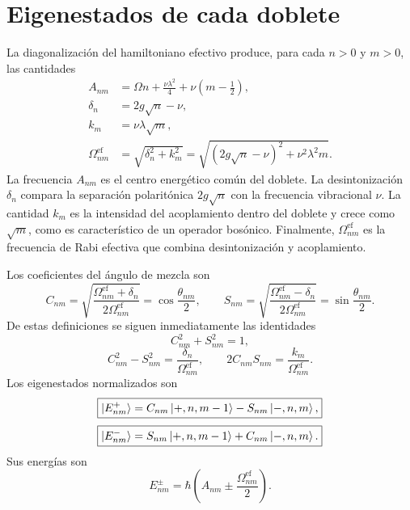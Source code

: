 \documentclass[11pt]{article}
\begin{document}
\section{Eigenestados de cada doblete}

La diagonalizaci\'on del hamiltoniano efectivo produce, para cada $n>0$ y
$m>0$, las cantidades
\begin{equation}
  \boxed{
  \begin{aligned}
  A_{nm}
  &=
  \Omega n+\frac{\nu\lambda^2}{4}
  +
  \nu\left(m-\frac12\right),
  \\
  \delta_n
  &=
  2g\sqrt n-\nu,
  \\
  k_m
  &=
  \nu\lambda\sqrt m,
  \\
  \Omega_{nm}^{\mathrm{ef}}
  &=
  \sqrt{\delta_n^2+k_m^2}
  =
  \sqrt{(2g\sqrt n-\nu)^2+\nu^2\lambda^2m}.
  \end{aligned}
  }
\end{equation}
La frecuencia $A_{nm}$ es el centro energ\'etico com\'un del doblete.
La desintonizaci\'on $\delta_n$ compara la separaci\'on polarit\'onica
$2g\sqrt n$ con la frecuencia vibracional $\nu$. La cantidad $k_m$ es la
intensidad del acoplamiento dentro del doblete y crece como $\sqrt m$, como es
caracter\'istico de un operador bos\'onico. Finalmente,
$\Omega_{nm}^{\mathrm{ef}}$ es la frecuencia de Rabi efectiva que combina
desintonizaci\'on y acoplamiento.

Los coeficientes del \'angulo de mezcla son
\begin{equation}
  \boxed{
  C_{nm}
  =
  \sqrt{
  \frac{\Omega_{nm}^{\mathrm{ef}}+\delta_n}
  {2\Omega_{nm}^{\mathrm{ef}}}
  }
  =
  \cos\frac{\theta_{nm}}{2},
  \qquad
  S_{nm}
  =
  \sqrt{
  \frac{\Omega_{nm}^{\mathrm{ef}}-\delta_n}
  {2\Omega_{nm}^{\mathrm{ef}}}
  }
  =
  \sin\frac{\theta_{nm}}{2}.
  }
\end{equation}
De estas definiciones se siguen inmediatamente las identidades
\begin{equation}
  C_{nm}^2+S_{nm}^2=1,
\end{equation}
\begin{equation}
  \boxed{
  C_{nm}^2-S_{nm}^2
  =
  \frac{\delta_n}{\Omega_{nm}^{\mathrm{ef}}},
  \qquad
  2C_{nm}S_{nm}
  =
  \frac{k_m}{\Omega_{nm}^{\mathrm{ef}}}.
  }
\end{equation}
Los eigenestados normalizados son
\begin{equation}
  \boxed{
  \ket{E_{nm}^{+}}
  =
  C_{nm}\ket{+,n,m-1}
  -
  S_{nm}\ket{-,n,m},
  }
\end{equation}
\begin{equation}
  \boxed{
  \ket{E_{nm}^{-}}
  =
  S_{nm}\ket{+,n,m-1}
  +
  C_{nm}\ket{-,n,m}.
  }
\end{equation}
Sus energ\'ias son
\begin{equation}
  \boxed{
  E_{nm}^{\pm}
  =
  \hbar
  \left(
  A_{nm}
  \pm
  \frac{\Omega_{nm}^{\mathrm{ef}}}{2}
  \right).
  }
\end{equation}
\end{document}
